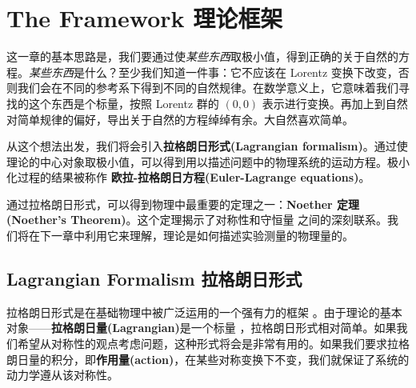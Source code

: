 
\newcommand\rd{\mathrm d}
\newcommand\ri{\mathrm i}

\chapter[理论框架]{The Framework 理论框架}\label{chap4}
这一章的基本思路是，我们要通过使{\itshape 某些东西}取极小值，得到正确的关于自然的方程。{\itshape 某些东西}是什么？至少我们知道一件事：它不应该在 Lorentz 变换下改变，否则我们会在不同的参考系下得到不同的自然规律。在数学意义上，它意味着我们寻找的这个东西是个标量，按照 Lorentz 群的 \( (0,0) \) 表示进行变换。再加上到自然对简单规律的偏好，导出关于自然的方程绰绰有余。大自然喜欢简单。

从这个想法出发，我们将会引入{\bfseries 拉格朗日形式(Lagrangian formalism)}。通过使理论的中心对象取极小值，可以得到用以描述问题中的物理系统的运动方程。极小化过程的结果被称作 {\bfseries 欧拉-拉格朗日方程(Euler-Lagrange equations)}。

通过拉格朗日形式，可以得到物理中最重要的定理之一：{\bfseries Noether 定理(Noether's Theorem)}。这个定理揭示了对称性和守恒量%
%
之间的深刻联系。我们将在下一章中利用它来理解，理论是如何描述实验测量的物理量的。

\section[拉格朗日形式]{Lagrangian Formalism \quad 拉格朗日形式}\label{sec4.1}

拉格朗日形式是在基础物理中被广泛运用的一个强有力的框架%
%
。由于理论的基本对象——{\bfseries 拉格朗日量(Lagrangian)}是一个标量%
%
，拉格朗日形式相对简单。如果我们希望从对称性的观点考虑问题，这种形式将会是非常有用的。如果我们要求拉格朗日量的积分，即{\bfseries 作用量(action)}，在某些对称变换下不变，我们就保证了系统的动力学遵从该对称性。


